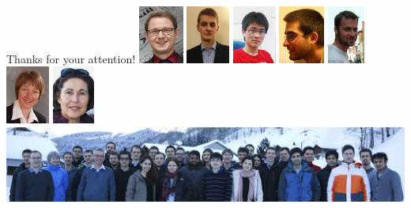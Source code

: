 \documentclass[presentation,12pt]{beamer}
\begin{document}
\begin{frame}{Thanks for your attention!}
  \includegraphics[height=1.9cm]{proeger.jpg} \hspace{1pt}
  \includegraphics[height=1.9cm]{dumazert.jpg} \hspace{1pt}
  \includegraphics[height=1.9cm]{bian.jpg} \hspace{1pt}
  \includegraphics[height=1.9cm]{sramek.jpg} \hspace{1pt}
  \includegraphics[height=1.9cm]{mihalak.jpg} \hspace{1pt}
  \includegraphics[height=1.9cm]{klute.jpg} \hspace{1pt}
  \includegraphics[height=1.9cm]{berger.jpg} \\[5pt]

  \includegraphics[width=\textwidth]{institute.jpg}\\  
\end{frame}
\end{document}
